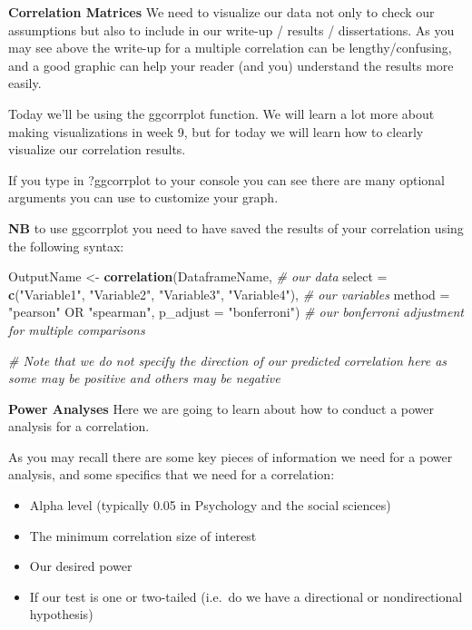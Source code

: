 \documentclass[
]{book}
\newenvironment{Shaded}{\begin{snugshade}}{\end{snugshade}}
\newcommand{\AttributeTok}[1]{\textcolor[rgb]{0.13,0.29,0.53}{#1}}
\newcommand{\CommentTok}[1]{\textcolor[rgb]{0.56,0.35,0.01}{\textit{#1}}}
\newcommand{\FunctionTok}[1]{\textcolor[rgb]{0.13,0.29,0.53}{\textbf{#1}}}
\newcommand{\NormalTok}[1]{#1}
\newcommand{\OtherTok}[1]{\textcolor[rgb]{0.56,0.35,0.01}{#1}}
\newcommand{\StringTok}[1]{\textcolor[rgb]{0.31,0.60,0.02}{#1}}
\begin{document}
\textbf{Correlation Matrices} We need to visualize our data not only to check our assumptions but also to include in our write-up / results / dissertations. As you may see above the write-up for a multiple correlation can be lengthy/confusing, and a good graphic can help your reader (and you) understand the results more easily.

Today we'll be using the ggcorrplot function. We will learn a lot more about making visualizations in week 9, but for today we will learn how to clearly visualize our correlation results.

If you type in ?ggcorrplot to your console you can see there are many optional arguments you can use to customize your graph.

\textbf{NB} to use ggcorrplot you need to have saved the results of your correlation using the following syntax:

\begin{Shaded}
\begin{Highlighting}[]
\NormalTok{OutputName }\OtherTok{\textless{}{-}} \FunctionTok{correlation}\NormalTok{(DataframeName, }\CommentTok{\# our data}
            \AttributeTok{select =} \FunctionTok{c}\NormalTok{(}\StringTok{"Variable1"}\NormalTok{, }\StringTok{"Variable2"}\NormalTok{, }\StringTok{"Variable3"}\NormalTok{, }\StringTok{"Variable4"}\NormalTok{), }\CommentTok{\# our variables}
             \AttributeTok{method =} \StringTok{"pearson"}\NormalTok{ OR }\StringTok{"spearman"}\NormalTok{,}
            \AttributeTok{p\_adjust =} \StringTok{"bonferroni"}\NormalTok{) }\CommentTok{\# our bonferroni adjustment for multiple comparisons}

\CommentTok{\# Note that we do not specify the direction of our predicted correlation here as some may be positive and others may be negative}
\end{Highlighting}
\end{Shaded}

\textbf{Power Analyses} Here we are going to learn about how to conduct a power analysis for a correlation.

As you may recall there are some key pieces of information we need for a power analysis, and some specifics that we need for a correlation:

\begin{itemize}
\item
  Alpha level (typically 0.05 in Psychology and the social sciences)
\item
  The minimum correlation size of interest
\item
  Our desired power
\item
  If our test is one or two-tailed (i.e.~do we have a directional or nondirectional hypothesis)
\end{itemize}
\end{document}

